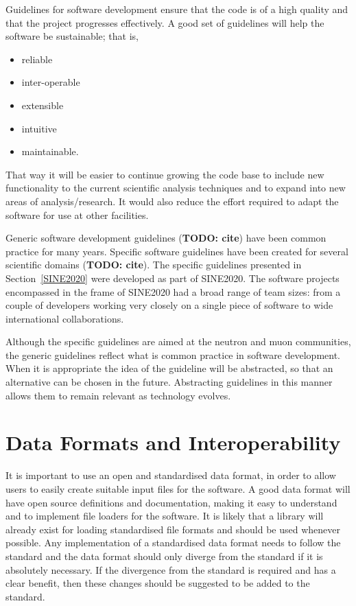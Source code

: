 \documentclass[jnr]{iosart2x}
\newcommand{\todo}[1]{\textbf{#1}}
\begin{document}
Guidelines for software development ensure that the code is of a high quality and that the project progresses effectively.
A good set of guidelines will help the software be sustainable; that is,
\begin{itemize}
\item{reliable}
\item{inter-operable}
\item{extensible}
\item{intuitive}
\item{maintainable.}
\end{itemize}
That way it will be easier to continue growing the code base to include new functionality to the current scientific analysis techniques and to expand into new areas of analysis/research.
It would also reduce the effort required to adapt the software for use at other facilities.

Generic software development guidelines (\todo{TODO: cite}) have been common practice for many years.
Specific software guidelines have been created for several scientific domains (\todo{TODO: cite}).
The specific guidelines presented in Section~\ref{SINE2020} were developed as part of SINE2020.
The software projects encompassed in the frame of SINE2020 had a broad range of team sizes: from a couple of developers working very closely on a single piece of software to wide international collaborations.

Although the specific guidelines are aimed at the neutron and muon communities, the generic guidelines reflect what is common practice in software development.
When it is appropriate the idea of the guideline will be abstracted, so that an alternative can be chosen in the future.
Abstracting guidelines in this manner allows them to remain relevant as technology evolves.

\section{Data Formats and Interoperability}
\label{Data Formats and Interoperability}

It is important to use an open and standardised data format, in order to allow users to easily create suitable input files for the software.
A good data format will have open source definitions and documentation, making it easy to understand and to implement file loaders for the software.
It is likely that a library will already exist for loading standardised file formats and should be used whenever possible.
Any implementation of a standardised data format needs to follow the standard and
the data format should only diverge from the standard if it is absolutely necessary.
If the divergence from the standard is required and has a clear benefit, then these changes should be suggested to be added to the standard.
\end{document}
